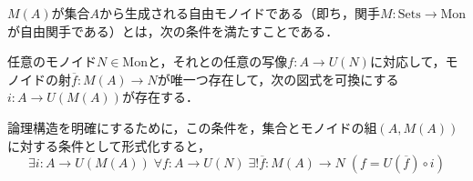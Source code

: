 \documentclass[uplatex, 12pt, dvipdfmx]{jsarticle}
\begin{document}
\begin{definition*}
    $M(A)$が集合$A$から生成される自由モノイドである（即ち，関手$M:\mathrm{Sets}\to\mathrm{Mon}$が自由関手である）とは，次の条件を満たすことである．

    任意のモノイド$N\in\mathrm{Mon}$と，それとの任意の写像$f:A\to U(N)$に対応して，モノイドの射$\overline{f}:M(A)\to N$が唯一つ存在して，次の図式を可換にする$i:A\to U(M(A))$が存在する．
    \begin{center}
    \end{center}
    論理構造を明確にするために，この条件を，集合とモノイドの組$(A,M(A))$に対する条件として形式化すると，
    \[ \exists i:A\to U(M(A))\; \forall f:A\to U(N)\; \exists! \overline{f}:M(A)\to N \; (f=U(\overline{f})\circ i) \]
    \rightline{$\blacksquare$}
\end{definition*}
\end{document}

